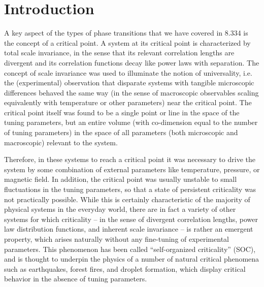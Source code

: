 \documentclass[aps,prb,reprint,superscriptaddress]{revtex4-2}
\begin{document}

\maketitle

\section{Introduction}

A key aspect of the types of phase transitions that we have covered in 8.334 is the concept of a critical point. A system at its critical point is characterized by total scale invariance, in the sense that its relevant correlation lengths are divergent and its correlation functions decay like power laws with separation. The concept of scale invariance was used to illuminate the notion of universality, i.e. the (experimental) observation that disparate systems with tangible microscopic differences behaved the same way (in the sense of macroscopic observables scaling equivalently with temperature or other parameters) near the critical point. The critical point itself was found to be a single point or line in the space of the tuning parameters, but an entire volume (with co-dimension equal to the number of tuning parameters) in the space of all parameters (both microscopic and macroscopic) relevant to the system.

Therefore, in these systems to reach a critical point it was necessary to drive the system by some combination of external parameters like temperature, pressure, or magnetic field. In addition, the critical point was usually unstable to small fluctuations in the tuning parameters, so that a state of persistent criticality was not practically possible. While this is certainly characteristic of the majority of physical systems in the everyday world, there are in fact a variety of other systems for which criticality -- in the sense of divergent correlation lengths, power law distribution functions, and inherent scale invariance -- is rather an emergent property, which arises naturally without any fine-tuning of experimental parameters\cite{jensen, otherbook}. This phenomenon has been called ``self-organized criticality'' (SOC), and is thought to underpin the physics of a number of natural critical phenomena such as earthquakes, forest fires, and droplet formation, which display critical behavior in the absence of tuning parameters.
\end{document}
